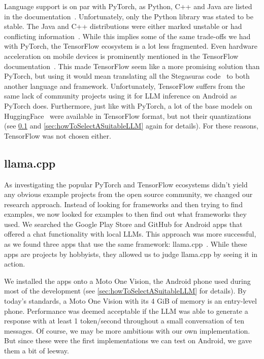 Language support is on par with PyTorch, as Python, C++ and Java are listed in the documentation~\cite{tensorflowTensorFlow}. Unfortunately, only the Python library was stated to be stable. The Java and C++ distributions were either marked unstable or had conflicting information~\cite{abadiTensorFlowLargescaleMachine2015,tensorflowAPIDocumentationTensorFlow}. While this implies some of the same trade-offs we had with PyTorch, the TensorFlow ecosystem is a lot less fragmented. Even hardware acceleration on mobile devices is prominently mentioned in the TensorFlow documentation~\cite{tensorflowTensorFlow}. This made TensorFlow seem like a more promising solution than PyTorch, but using it would mean translating all the Stegasuras code~\cite{zieglerHarvardnlpNeuralSteganography2025} to both another language and framework. Unfortunately, TensorFlow suffers from the same lack of community projects using it for \gls{LLM} inference on Android as PyTorch does. Furthermore, just like with PyTorch, a lot of the base models on HuggingFace~\cite{huggingfaceModelsHuggingFace2025} were available in TensorFlow format, but not their quantizations (see \cref{sec:llamaCpp} and \cref{sec:howToSelectASuitableLLM} again for details). For these reasons, TensorFlow was not chosen either.

\subsection{llama.cpp}
\label{sec:llamaCpp}
As investigating the popular PyTorch and TensorFlow ecosystems didn't yield any obvious example projects from the open source community, we changed our research approach. Instead of looking for frameworks and then trying to find examples, we now looked for examples to then find out what frameworks they used. We searched the Google Play Store and GitHub for Android apps that offered a chat functionality with local \glspl{LLM}. This approach was more successful, as we found three apps that use the same framework: llama.cpp~\cite{panchalShubham0204SmolChatAndroid2025,vali-98Vali98ChatterUI2025,ghorbaniAghorbaniPocketpalai2025}. While these apps are projects by hobbyists, they allowed us to judge llama.cpp by seeing it in action.

We installed the apps onto a Moto One Vision, the Android phone used during most of the development (see \cref{sec:howToSelectASuitableLLM} for details). By today's standards, a Moto One Vision with its 4 GiB of memory is an entry-level phone. Performance was deemed acceptable if the \gls{LLM} was able to generate a response with at least 1 token/second throughout a small conversation of ten messages. Of course, we may be more ambitious with our own implementation. But since these were the first implementations we can test on Android, we gave them a bit of leeway.

